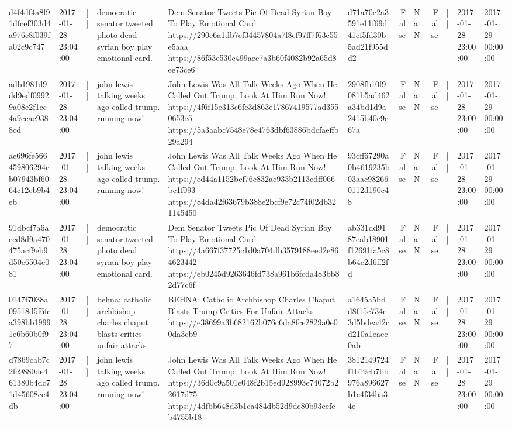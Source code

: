 \begin{tabular}{llllllrlrlll}
d4f4df4a8f91dfcef303d4a976c8f039fa02c9c747 & 2017-01-28 23:04:00 & [] & democratic senator tweeted photo dead syrian boy play emotional card. & Dem Senator Tweets Pic Of Dead Syrian Boy To Play Emotional Card https://290c6a1db7ef34457804a7f8ef97ff7f63e55e5aaa https://86f53e530c499aec7a3b60f4082b92a65d8ee73ce6 & d71a70c2a3591e11f69d41cf5fd30b5ad21f955dd2 & False & NaN & False & [] & 2017-01-28 23:00:00 & 2017-01-29 00:00:00 \\
adb1981d9dd9edf09929a08e2f1ce4a9ceac9388cd & 2017-01-28 23:04:00 & [] & john lewis talking weeks ago called trump. running now! & John Lewis Was All Talk Weeks Ago When He Called Out Trump; Look At Him Run Now! https://4f6f15e313c6fc3d863e17867419577ad3550653e5 https://5a3aabc7548e78e4763dbf63886bdcfaeffb29a294 & 2908fb10f9081b5ad462a34bd1d9a2415b40e9e67a & False & NaN & False & [] & 2017-01-28 23:00:00 & 2017-01-29 00:00:00 \\
ae696fe566459806294cb07943bf6064c12cb9b4eb & 2017-01-28 23:04:00 & [] & john lewis talking weeks ago called trump. running now! & John Lewis Was All Talk Weeks Ago When He Called Out Trump; Look At Him Run Now! https://ed44a1152bcf76c832ac933b2113cdff066bc1f093 https://84da42f63679b388e2bcf9e72c74f02db321145450 & 93cff67290a0b4619235b03aac982660112d190c48 & False & NaN & False & [] & 2017-01-28 23:00:00 & 2017-01-29 00:00:00 \\
91dbcf7a6aecd8d9a470475acf9eb9d50e6504e081 & 2017-01-28 23:04:00 & [] & democratic senator tweeted photo dead syrian boy play emotional card. & Dem Senator Tweets Pic Of Dead Syrian Boy To Play Emotional Card https://4a667f37725c1d0a704db3579188eed2e864623442 https://eb0245d9263646fd738a961b6fcda483bb82d77c6f & ab331dd9187eab18901f12691fa5c8b64e2d6ff2fd & False & NaN & False & [] & 2017-01-28 23:00:00 & 2017-01-29 00:00:00 \\
0147f7038a09518d5f6fca398bb19991e6b60b0f97 & 2017-01-28 23:04:00 & [] & behna: catholic archbishop charles chaput blasts critics unfair attacks & BEHNA: Catholic Archbishop Charles Chaput Blasts Trump Critics For Unfair Attacks https://e38699a3b682162b076c6da8fce2829a0e00da3cb9 & a1645a5bdd8f15c734e3d5bdea42cd210a1eacc0ab & False & NaN & False & [] & 2017-01-28 23:00:00 & 2017-01-29 00:00:00 \\
d7869cab7c2fc9880de461380b4dc71d45608cc4db & 2017-01-28 23:04:00 & [] & john lewis talking weeks ago called trump. running now! & John Lewis Was All Talk Weeks Ago When He Called Out Trump; Look At Him Run Now! https://36d0c9a501e048f2b15ed928993e74072b22617d75 https://4dfbb648d3b1ca484db52d9dc80b93eefeb4755b18 & 3812149724f1b19cb7bb976a896627b1c4f34ba34e & False & NaN & False & [] & 2017-01-28 23:00:00 & 2017-01-29 00:00:00 \\

\end{tabular}
